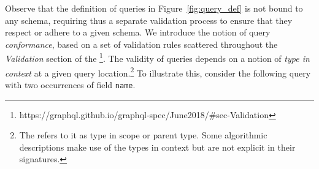 Observe that the definition of queries in Figure~\ref{fig:query_def} is not bound to any schema, requiring thus a separate validation process to ensure that they respect or adhere to a given schema. We introduce the notion of query \textit{conformance}, based on a set of validation rules scattered throughout the \textit{Validation} section of the \spec{}\footnote{https://graphql.github.io/graphql-spec/June2018/\#sec-Validation}. The validity of queries depends on a notion of \textit{type in context} at a given query location.\footnote{The \spec refers to it as type in scope or parent type. Some algorithmic descriptions make use of the types in context but are not explicit in their signatures.} %
To illustrate this, consider the following query with two occurrences of field \texttt{name}.

